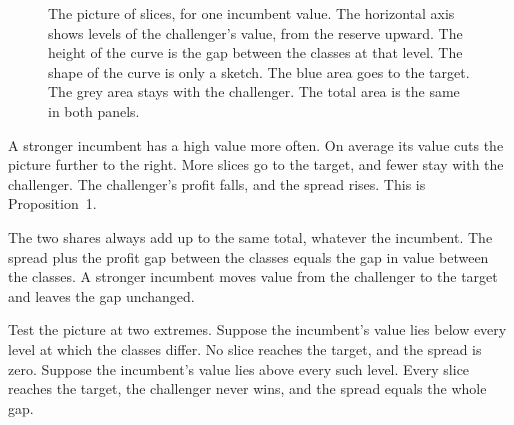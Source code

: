 \begin{figure}[t]
\centering
{}
\caption{The picture of slices, for one incumbent value. The horizontal axis shows levels of the challenger's value, from the reserve upward. The height of the curve is the gap between the classes at that level. The shape of the curve is only a sketch. The blue area goes to the target. The grey area stays with the challenger. The total area is the same in both panels.}
\label{fig:story-slices}
\end{figure}

A stronger incumbent has a high value more often. On average its value cuts the picture further to the right. More slices go to the target, and fewer stay with the challenger. The challenger's profit falls, and the spread rises. This is Proposition~1.

The two shares always add up to the same total, whatever the incumbent. The spread plus the profit gap between the classes equals the gap in value between the classes. A stronger incumbent moves value from the challenger to the target and leaves the gap unchanged.

Test the picture at two extremes. Suppose the incumbent's value lies below every level at which the classes differ. No slice reaches the target, and the spread is zero. Suppose the incumbent's value lies above every such level. Every slice reaches the target, the challenger never wins, and the spread equals the whole gap.

